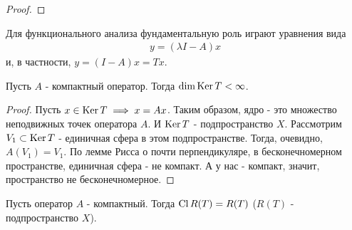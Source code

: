 \begin{proof}
    \todo
\end{proof}

Для функционального анализа фундаментальную роль играют уравнения вида 
\begin{gather}
    y = (\lambda I - A)x
\end{gather}
и, в частности, $y = (I - A)x = Tx$. 


\begin{statement}
    Пусть $A$ - компактный оператор. Тогда $\dim \operatorname{Ker} T < \infty$.
\end{statement}

\begin{proof}
    Пусть $x \in \operatorname{Ker} T \implies x = Ax$. Таким образом, ядро - это множество неподвижных точек оператора $A$. И $\operatorname{Ker} T$ - подпространство $X$.
    Рассмотрим $V_1 \subset \operatorname{Ker} T$ - единичная сфера в этом подпространстве. Тогда, очевидно, $A(V_1) = V_1$. По лемме Рисса о почти перпендикуляре, в бесконечномерном 
    пространстве, единичная сфера - не компакт. А у нас - компакт, значит,  пространство не бесконечномерное.
\end{proof}


\begin{theorem}
    Пусть оператор $A$ - компактный. Тогда $\operatorname{Cl} R(T) = R(T)$ ($R(T)$ - подпространство $X$).
\end{theorem}

